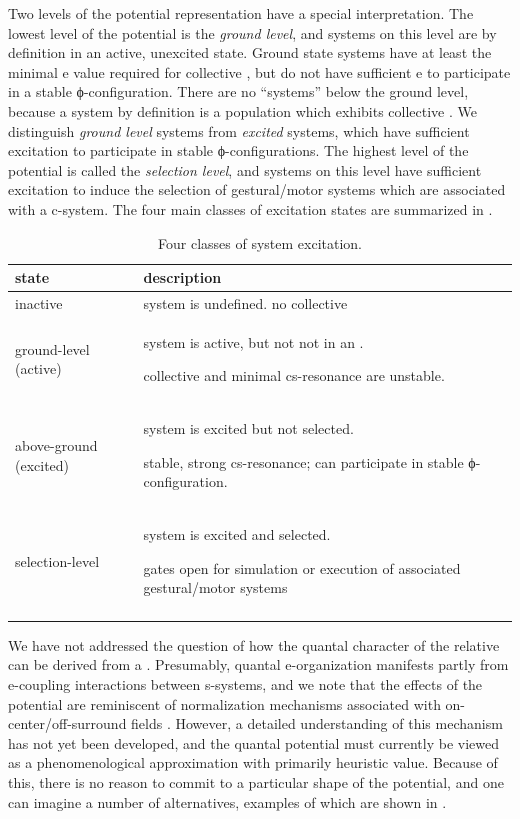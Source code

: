   Two levels of the potential representation have a special  interpretation. The lowest level of the potential is the \textit{ground level}, and systems on this level are by definition in an active, unexcited state. Ground state systems have at least the minimal e value required for collective , but do not have sufficient e to participate in a stable ϕ-configuration. There are no “systems” below the ground level, because a system by definition is a population which exhibits collective . We distinguish \textit{ground level} systems from \textit{excited} systems, which have sufficient excitation to participate in stable ϕ-configurations. The highest level of the potential is called the \textit{selection level}, and systems on this level have sufficient excitation to induce the selection of gestural/motor systems which are associated with a c-system. The four main classes of excitation states are summarized in {}.

\begin{table}
\begin{tabularx}{\textwidth}{llQ}
\lsptoprule
\textbf{state} & \textbf{description}\\
\midrule 
inactive & system is undefined. no collective \\
ground-level (active) & system is active, but not not in an .

collective  and minimal cs-resonance are unstable.\\
above-ground (excited) & system is excited but not selected.

stable, strong cs-resonance; can participate in stable ϕ-configuration.\\
selection-level & system is excited and selected.

gates open for simulation or execution of associated gestural/motor systems\\
\lspbottomrule
\end{tabularx}
\caption{Four classes of system excitation.}\label{tab:1:2}
\end{table}
 
 We have not addressed the question of how the quantal character of the relative  can be derived from a . Presumably, quantal e-organization manifests partly from e-coupling interactions between s-systems, and we note that the effects of the potential are reminiscent of normalization mechanisms associated with on-center/off-surround fields \citep{Grossberg1978,Grossberg1987}. However, a detailed understanding of this mechanism has not yet been developed, and the quantal potential must currently be viewed as a phenomenological approximation with primarily heuristic value. Because of this, there is no reason to commit to a particular shape of the potential, and one can imagine a number of alternatives, examples of which are shown in {}.

